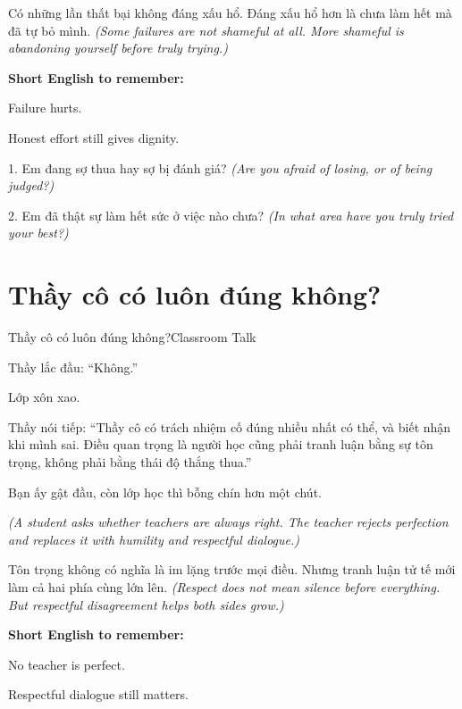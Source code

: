 \begin{baihoc}
Có những lần thất bại không đáng xấu hổ. Đáng xấu hổ hơn là chưa làm hết mà đã tự bỏ mình.
\textit{(Some failures are not shameful at all. More shameful is abandoning yourself before truly trying.)}
\end{baihoc}

\begin{ghinhoanh}
\textbf{Short English to remember:}

Failure hurts.

Honest effort still gives dignity.
\end{ghinhoanh}

\begin{tuhocnhanh}
1. Em đang sợ thua hay sợ bị đánh giá? \textit{(Are you afraid of losing, or of being judged?)}

2. Em đã thật sự làm hết sức ở việc nào chưa? \textit{(In what area have you truly tried your best?)}
\end{tuhocnhanh}
\ngancach

\section{Thầy cô có luôn đúng không?}
\begin{truyen}{Thầy cô có luôn đúng không?}{Classroom Talk}

Thầy lắc đầu: ``Không.''

Lớp xôn xao.

Thầy nói tiếp: ``Thầy cô có trách nhiệm cố đúng nhiều nhất có thể, và biết nhận khi mình sai. Điều quan trọng là người học cũng phải tranh luận bằng sự tôn trọng, không phải bằng thái độ thắng thua.''

Bạn ấy gật đầu, còn lớp học thì bỗng chín hơn một chút.

\textit{(A student asks whether teachers are always right. The teacher rejects perfection and replaces it with humility and respectful dialogue.)}
\end{truyen}

\begin{baihoc}
Tôn trọng không có nghĩa là im lặng trước mọi điều. Nhưng tranh luận tử tế mới làm cả hai phía cùng lớn lên.
\textit{(Respect does not mean silence before everything. But respectful disagreement helps both sides grow.)}
\end{baihoc}

\begin{ghinhoanh}
\textbf{Short English to remember:}

No teacher is perfect.

Respectful dialogue still matters.
\end{ghinhoanh}

